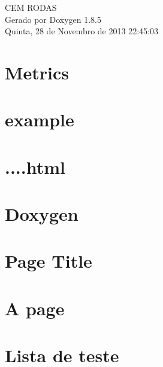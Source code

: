 \documentclass[twoside]{book}
\newcommand{\clearemptydoublepage}{%
  \newpage{\pagestyle{empty}\cleardoublepage}%
}
\begin{document}
\hypersetup{pageanchor=false}
\begin{titlepage}
\vspace*{7cm}
\begin{center}%
{\Large C\-E\-M R\-O\-D\-A\-S }\\
\vspace*{1cm}
{\large Gerado por Doxygen 1.8.5}\\
\vspace*{0.5cm}
{\small Quinta, 28 de Novembro de 2013 22:45:03}\\
\end{center}
\end{titlepage}
\clearemptydoublepage
\tableofcontents
\clearemptydoublepage
{}
\hypersetup{pageanchor=true}

\chapter{Metrics}
\label{index}\hypertarget{index}{}
\chapter{example}
\label{example}
\hypertarget{example}{}

\chapter{....html}
\label{features}
\hypertarget{features}{}

\chapter{Doxygen}
\label{md__c_1__users_teste_git_doxygen__r_e_a_d_m_e}
\hypertarget{md__c_1__users_teste_git_doxygen__r_e_a_d_m_e}{}

\chapter{Page Title}
\label{mypage}
\hypertarget{mypage}{}

\chapter{A page}
\label{item2}
\hypertarget{item2}{}

\chapter{Lista de teste}
\label{test}
\hypertarget{test}{}

\end{document}
